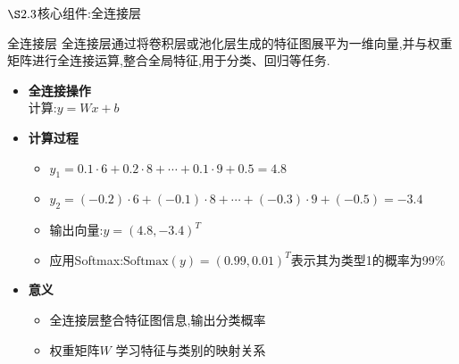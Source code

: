 \documentclass{beamer}
\begin{document}
\begin{frame}{$\S2.3$核心组件:全连接层}
    \begin{block}{全连接层}
        全连接层通过将卷积层或池化层生成的特征图展平为一维向量,并与权重矩阵进行全连接运算,整合全局特征,用于分类、回归等任务.
    \end{block}
    \begin{itemize}
        \item \textbf{全连接操作}
        \\计算:$y=Wx+b$
        \item \textbf{计算过程}
        \begin{itemize}
            \item $y_1=0.1 \cdot 6+0.2 \cdot 8+\cdots+0.1 \cdot 9+0.5=4.8$
            \item $y_2=(-0.2) \cdot 6+(-0.1) \cdot 8+\cdots+(-0.3) \cdot 9+(-0.5)=-3.4$
            \item 输出向量:$y=(4.8,-3.4)^T$
            \item 应用Softmax:$\text{Softmax}(y)=(0.99, 0.01)^T$表示其为类型1的概率为99\%
        \end{itemize}
        \item \textbf{意义}
        \begin{itemize}
            \item 全连接层整合特征图信息,输出分类概率
            \item 权重矩阵$W$ 学习特征与类别的映射关系
        \end{itemize}
    \end{itemize}
\end{frame}
\end{document}
